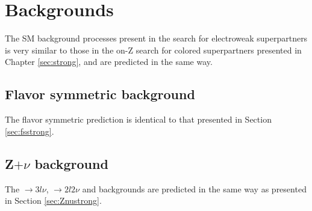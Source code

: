 \section{Backgrounds}
\noindent
\justify
The SM background processes present in the search for electroweak superpartners is very similar to those in the on-Z search for colored superpartners presented in Chapter \ref{sec:strong}, and are predicted in the same way. 
\subsection*{Flavor symmetric background}
\noindent
\justify
The flavor symmetric prediction is identical to that presented in Section \ref{sec:fsstrong}. 
\subsection*{Z$+\nu$ background}
\noindent
\justify
The \PWZ$\rightarrow3l\nu$, \PZZ$\rightarrow2l2\nu$ and \ttZ backgrounds are predicted in the same way as presented in Section \ref{sec:Znustrong}. 
